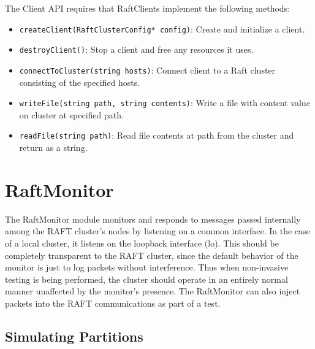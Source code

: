 \documentclass[UTF8]{article}
\begin{document}
The Client API requires that RaftClients implement the following methods:

\begin{itemize}
\item \texttt{createClient(RaftClusterConfig* config)}: Create and initialize a client.
\item \texttt{destroyClient()}: Stop a client and free any resources it uses.
\item \texttt{connectToCluster(string hosts)}: Connect client to a Raft cluster consisting of the specified hosts.
\item \texttt{writeFile(string path, string contents)}: Write a file with content value on cluster at specified path.
\item \texttt{readFile(string path)}: Read file contents at path from the cluster and return as a string.
\end{itemize}

\section{RaftMonitor}

The RaftMonitor module monitors and responds to messages passed internally among the RAFT cluster's nodes by listening on a common interface. In the case of a local cluster, it listens on the loopback interface (lo). This should be completely transparent to the RAFT cluster, since the default behavior of the monitor is just to log packets without interference. Thus when non-invasive testing is being performed, the cluster should operate in an entirely normal manner unaffected by the monitor's presence. The RaftMonitor can also inject packets into the RAFT communications as part of a test.

\subsection{Simulating Partitions}
\end{document}
